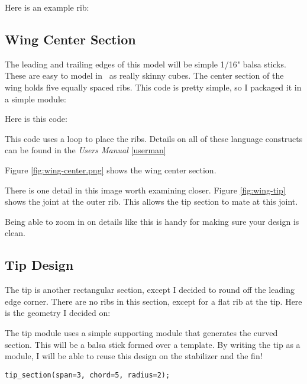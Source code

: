 Here is an example rib:


\subsection{Wing Center Section}

The leading and trailing edges of this model will be simple 1/16" balsa sticks.
These are easy to model in \osc\ as really skinny cubes. The center section
of the wing holds five equally spaced ribs. This code is pretty simple, so I
packaged it in a simple module:

Here is this code:



This code uses a loop to place the ribs. Details on all of these language
constructs can be found in the {\it Users Manual} \ref{userman}

Figure \ref{fig:wing-center.png} shows the wing center section.


There is one detail in this image worth examining closer. Figure
\ref{fig:wing-tip} shows the joint at the outer rib. This allows the tip section
to mate at this joint.


Being able to zoom in on details like this is handy for making sure your design
is clean.

\subsection{Tip Design}

The tip is another rectangular section, except I decided to round off the
leading edge corner. There are no ribs in this section, except for a flat rib
at the tip. Here is the geometry I decided on:


The tip module uses a simple supporting module that generates the curved section.
This will be a balsa stick formed over a template.  By writing the tip as a
module, I will be able to reuse this design on the stabilizer and the fin!

\begin{lstlisting}
tip_section(span=3, chord=5, radius=2);
\end{lstlisting}

